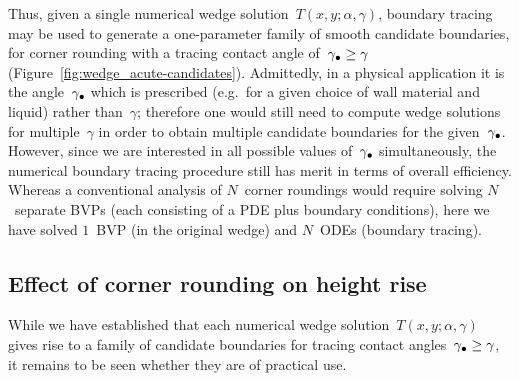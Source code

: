 Thus, given a single numerical wedge solution~$T (x, y; \alpha, \gamma)$,
boundary tracing may be used to generate a one-parameter family
of smooth candidate boundaries,
for corner rounding
with a tracing contact angle of~$\gamma_\bullet \ge \gamma$
(Figure~\ref{fig:wedge_acute-candidates}).
Admittedly, in a physical application
it is the angle~$\gamma_\bullet$ which is prescribed
(e.g.~for a given choice of wall material and liquid)
rather than~$\gamma$;
therefore one would still need to compute wedge solutions
for multiple~$\gamma$
in order to obtain multiple candidate boundaries
for the given~$\gamma_\bullet$.
However, since we are interested in
all possible values of~$\gamma_\bullet$ simultaneously,
the numerical boundary tracing procedure
still has merit in terms of overall efficiency.
Whereas a conventional analysis of $N$~corner roundings
would require solving $N$~separate BVPs
(each consisting of a PDE plus boundary conditions),
here we have solved $1$~BVP (in the original wedge)
and $N$~ODEs (boundary tracing).

\subsection{Effect of corner rounding on height rise}
\label{sec:moderate.multiple.effect}

While we have established that
each numerical wedge solution~$T (x, y; \alpha, \gamma)$
gives rise to a family of candidate boundaries
for tracing contact angles~$\gamma_\bullet \ge \gamma$,
it remains to be seen whether they are of practical use.

\begin{figure}
\end{figure}

